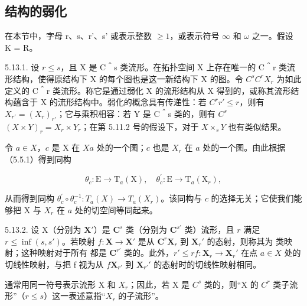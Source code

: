 \subsection{结构的弱化}

在本节中，字母 r、s、r'、s' 或表示整数 \(\geqslant1\)，或表示符号 \(\infty\) 和 \(\omega\) 之一。假设 K = R。

5.13.1. 设 \(r \leqslant s\)，且 X 是 C＾s 类流形。在拓扑空间 X 上存在唯一的 C＾r 类流形结构，使得原结构下 X 的每个图也是这一新结构下 X 的图。令 \(C^s\)\(C^r\)\(X_r\) 为如此定义的 C＾r 类流形。称它是通过弱化 X 的流形结构从 X 得到的，或称其流形结构蕴含于 X 的流形结构中。弱化的概念具有传递性：若 \(C^r\)\(r' \leqslant r\)，则有 \(X_{r'} = (X_r)_{r'}\)；它与乘积相容：若 Y 是 C＾s 类的，则有 \(C^s\)\((X \times Y)_r = X_r \times Y_r\)；在第 5.11.2 号的假设下，对于 \(X \times_s Y\) 也有类似结果。

令 \(a\in X\)，\(c\) 是 X 在 \(X\)\(a\) 处的一个图；\(c\) 也是 \(X_r\) 在 \(a\) 处的一个图。由此根据（5.5.1）得到同构

\[
\theta_ {c}: \mathrm{E} \rightarrow \mathrm{T} _ {a} (\mathrm{X}), \quad \theta_ {c} ^ {\prime}: \mathrm{E} \rightarrow \mathrm{T} _ {a} (\mathrm{X} _ {r}),
\]

从而得到同构 \(\theta_{c}^{\prime}\circ\theta_{c}^{-1}:T_{a}(X)\to T_{a}(X_{r})\)。该同构与 \(c\) 的选择无关；它使我们能够把 X 与 \(X_{r}\) 在 \(a\) 处的切空间等同起来。

5.13.2. 设 X（分别为 \(\mathbf{X}'\)）是 \(\mathbf{C}^s\) 类（分别为 \(\mathbf{C}^{s'}\) 类）流形，且 \(r\) 满足 \(r \leqslant \inf(s, s')\)。若映射 \(f: \mathbf{X} \to \mathbf{X}'\) 是从 \(\mathbf{C}^r\)\(\mathbf{X}_r\) 到 \(\mathbf{X}_r'\) 的态射，则称其为  类映射；这种映射对于所有  都是 \(\mathbf{C}^{r'}\) 类的。此外，\(r' \leqslant r\)\(f: \mathbf{X}_r \to \mathbf{X}_r'\) 在点 \(a \in X\) 处的切线性映射，与把 f 视为从 \(f\)\(\mathbf{X}_{r'}\) 到 \(\mathbf{X}_{r'}'\) 的态射时的切线性映射相同。

通常用同一符号表示流形 X 和 \(X_{r}\)；因此，若 X 是 \(C^{s}\) 类的，则“X 的 \(C^{r}\) 类子流形”（\(r \leqslant s\)）这一表述意指“\(X_{r}\) 的子流形”。

